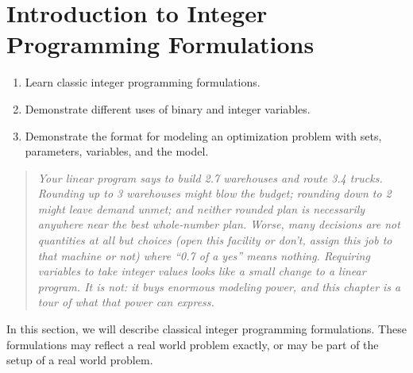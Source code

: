 


% 
%

\chapter{Introduction to Integer Programming Formulations}
\label{sec:IP-formulations} 
\begin{outcome}
\begin{enumerate}
\item[A.] Learn classic integer programming formulations.
\item[B.] Demonstrate different uses of binary and integer variables.
\item[C.]  Demonstrate the format for modeling an optimization problem with sets, parameters, variables, and the model.
\end{enumerate}
\end{outcome}

\begin{quote}
\itshape Your linear program says to build 2.7 warehouses and route 3.4 trucks. Rounding up to 3 warehouses might blow the budget; rounding down to 2 might leave demand unmet; and neither rounded plan is necessarily anywhere near the best whole-number plan. Worse, many decisions are not quantities at all but choices (open this facility or don't, assign this job to that machine or not) where ``0.7 of a yes'' means nothing. Requiring variables to take integer values looks like a small change to a linear program. It is not: it buys enormous modeling power, and this chapter is a tour of what that power can express.
\end{quote}





In this section, we will describe classical integer programming formulations.     These formulations may reflect  a real world problem exactly, or may be part of the setup of a real world problem.   

